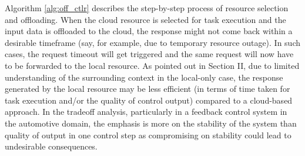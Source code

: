 Algorithm \ref{alg:off_ctlr} describes the step-by-step process of resource selection and offloading. When the cloud resource is selected for task execution and the input data is offloaded to the cloud, the response might not come back within a desirable timeframe (say, for example, due to temporary resource outage). In such cases, the request timeout will get triggered and the same request will now have to be forwarded to the local resource. As pointed out in Section II, due to limited understanding of the surrounding context in the local-only case, the response generated by the local resource may be less efficient (in terms of time taken for task execution and/or the quality of control output) compared to a cloud-based approach. In the tradeoff analysis, particularly in a feedback control system in the automotive domain, the emphasis is more on the stability of the system than quality of output in one control step as compromising on stability could lead to undesirable consequences.